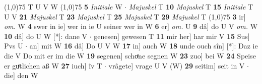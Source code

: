 \documentclass[8pt,a4paper,notitlepage]{article}
\begin{document}
\begin{table}[ht]
\begin{minipage}[t]{0.5\linewidth}
\scriptsize
\line(1,0){75} \newline
T U V W \newline
\line(1,0){75} \newline
\textbf{5} \textit{Initiale} W   $\cdot$ \textit{Majuskel} T  \textbf{10} \textit{Majuskel} T  \textbf{15} \textit{Initiale} T U V  \textbf{21} \textit{Majuskel} T  \textbf{23} \textit{Majuskel} T  \textbf{25} \textit{Majuskel} T  \textbf{29} \textit{Majuskel} T  \newline
\line(1,0){75} \newline
\textbf{3} ir] \textit{om.} W \textbf{4} swer in ie] wer in ie U seiner wer in W \textbf{6} er] \textit{om.} U \textbf{9} dâ] do U V \textit{om.} W \textbf{10} dâ] do U W [*]: dane V  $\cdot$ genesen] gewesen T \textbf{11} mir her] har mir V \textbf{15} Sus] Pvs U  $\cdot$ an] mit W \textbf{16} dâ] Do U V W \textbf{17} in] auch W \textbf{18} unde ouch sîn] [*]: Daz ie die V Do mit er im die W \textbf{19} segenen] schoͤne segnen W \textbf{23} zuo] bei W \textbf{24} Speise er guͤtlichen aß W \textbf{27} iuch] îv T  $\cdot$ vrâgete] vrage U V (W) \textbf{29} seitim] seit in V  $\cdot$ die] den W \newline
\end{minipage}
\end{table}
\end{document}
